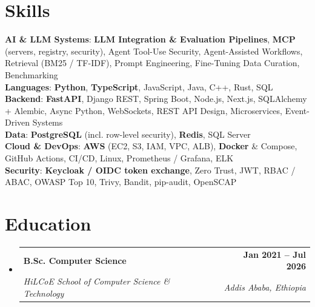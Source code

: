 \documentclass[letterpaper,11pt]{article}
\makeatletter
\newcommand{\resumeSubheading}[4]{
  \vspace{-0.01pt}\item
    \begin{tabular*}{1.0\textwidth}[t]{l@{\extracolsep{\fill}}r}
      \textbf{#1} & \textbf{\small #2} \\
      \textit{\small#3} & \textit{\small #4} \\
    \end{tabular*}\vspace{-7pt}
}
\newcommand{\resumeSubHeadingListStart}{\begin{itemize}[leftmargin=0.0in, label={}]}
\newcommand{\resumeSubHeadingListEnd}{\end{itemize}}
\makeatother
\begin{document}
\section{Skills}
 \begin{itemize}[leftmargin=0.15in, label={}]
    \small{\item{
     \textbf{AI \& LLM Systems}{: \textbf{LLM Integration \& Evaluation Pipelines}, \textbf{MCP} (servers, registry, security), Agent Tool-Use Security, Agent-Assisted Workflows, Retrieval (BM25 / TF-IDF), Prompt Engineering, Fine-Tuning Data Curation, Benchmarking} \\
     \textbf{Languages}{: \textbf{Python}, \textbf{TypeScript}, JavaScript, Java, C++, Rust, SQL} \\
     \textbf{Backend}{: \textbf{FastAPI}, Django REST, Spring Boot, Node.js, Next.js, SQLAlchemy + Alembic, Async Python, WebSockets, REST API Design, Microservices, Event-Driven Systems} \\
     \textbf{Data}{: \textbf{PostgreSQL} (incl. row-level security), \textbf{Redis}, SQL Server} \\
     \textbf{Cloud \& DevOps}{: \textbf{AWS} (EC2, S3, IAM, VPC, ALB), \textbf{Docker} \& Compose, GitHub Actions, CI/CD, Linux, Prometheus / Grafana, ELK} \\
     \textbf{Security}{: \textbf{Keycloak / OIDC token exchange}, Zero Trust, JWT, RBAC / ABAC, OWASP Top 10, Trivy, Bandit, pip-audit, OpenSCAP} \\
    }}
 \end{itemize}
 \vspace{-16pt}

\section{Education}
  \resumeSubHeadingListStart
    \resumeSubheading
      {B.Sc. Computer Science}{Jan 2021 -- Jul 2026}
      {HiLCoE School of Computer Science \& Technology}{Addis Ababa, Ethiopia}
  \resumeSubHeadingListEnd
 \vspace{-30pt}
\end{document}
